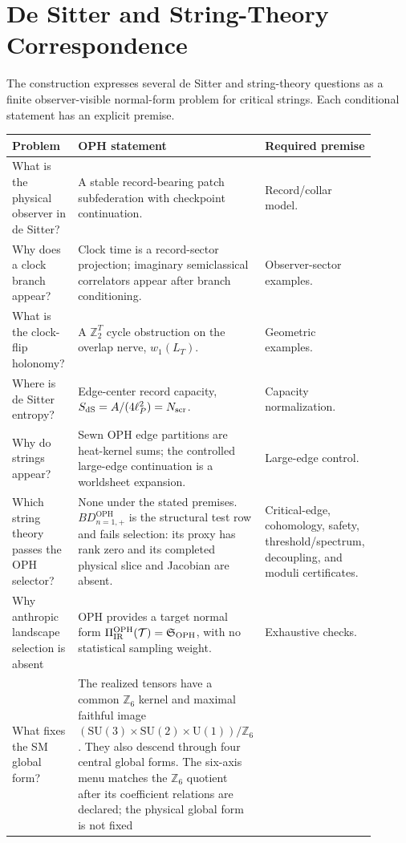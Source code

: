 \documentclass[11pt]{article}
\theoremstyle{remark}
\theoremstyle{plain}
\newcommand{\OPH}{\mathrm{OPH}}
\newcommand{\SU}{\mathrm{SU}}
\newcommand{\U}{\mathrm{U}}
\newcommand{\Z}{\mathbb Z}
\begin{document}
\section{De Sitter and String-Theory Correspondence}

The construction expresses several de Sitter and string-theory questions as a finite
observer-visible normal-form problem for critical strings. Each conditional statement has an
explicit premise.

\begin{longtable}{L{0.27\linewidth}L{0.43\linewidth}L{0.20\linewidth}}
\toprule
\textbf{Problem} & \textbf{OPH statement} & \textbf{Required premise} \\
\midrule
What is the physical observer in de Sitter? & A stable record-bearing patch subfederation with
checkpoint continuation. & Record/collar model. \\
Why does a clock branch appear? & Clock time is a record-sector projection; imaginary
semiclassical correlators appear after branch conditioning. & Observer-sector examples. \\
What is the clock-flip holonomy? & A \(\Z_2^T\) cycle obstruction on the overlap nerve,
\(w_1(L_T)\). & Geometric examples. \\
Where is de Sitter entropy? & Edge-center record capacity,
\(S_{\rm dS}=A/(4\ell_P^2)=N_{\rm scr}\). & Capacity normalization. \\
Why do strings appear? & Sewn OPH edge partitions are heat-kernel sums; the controlled
large-edge continuation is a worldsheet expansion. & Large-edge control. \\
Which string theory passes the OPH selector? & None under the stated premises.
\(BD_{n=1,+}^{\OPH}\) is the structural test row and fails selection: its proxy has rank
zero and its completed physical slice and Jacobian are absent. & Critical-edge, cohomology, safety,
threshold/spectrum, decoupling, and moduli certificates. \\
Why anthropic landscape selection is absent & OPH provides a target normal form
\(\Pi_{\rm IR}^{\OPH}(\mathcal T)=\mathfrak S_{\OPH}\), with no statistical sampling weight. & Exhaustive checks. \\
What fixes the SM global form? & The realized tensors have a common \(\Z_6\) kernel and maximal
faithful image \((\SU(3)\times\SU(2)\times\U(1))/\Z_6\). They also descend through four central
global forms. The six-axis menu matches the \(\Z_6\) quotient after its
coefficient relations are declared; the physical global form is not fixed

\end{longtable}
\end{document}
